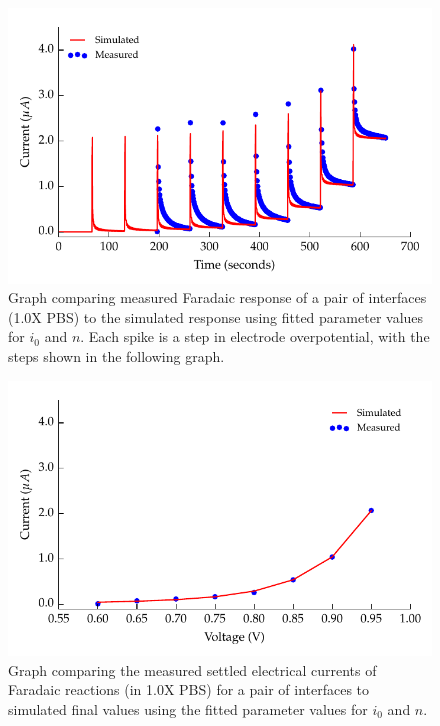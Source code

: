         \begin{figure}
          \centering
          \includegraphics{content/pt2/08-InterfaceParameters/graphics/graph_faradaic_currentVsTimeThesis}
          \caption{\label{fig:graph_faradaic_currentVsTimeThesis} Graph comparing measured Faradaic response of a pair of interfaces (1.0X PBS) to the simulated response using fitted parameter values for $i_0$ and $n$. Each spike is a step in electrode overpotential, with the steps shown in the following graph.}
        \end{figure}
        \begin{figure}
          \centering
          \includegraphics{content/pt2/08-InterfaceParameters/graphics/graph_faradaic_currentVsVoltageThesis}
          \caption{\label{fig:graph_faradaic_currentVsVoltageThesis} Graph comparing the measured settled electrical currents of Faradaic reactions (in 1.0X PBS) for a pair of interfaces to simulated final values using the fitted parameter values for $i_0$ and $n$.}
        \end{figure}

